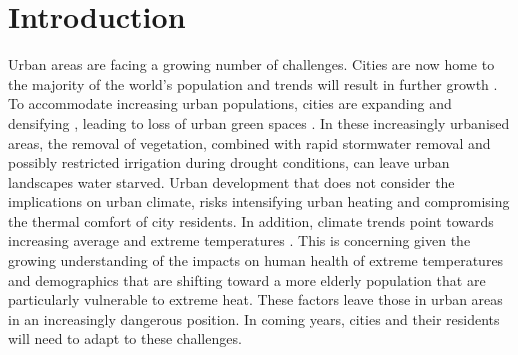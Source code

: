 \documentclass[final,3p,times,authoryear]{elsarticle}
\begin{document}

\section{Introduction}\label{sec:introduction}
Urban areas are facing a growing number of challenges. Cities are now home to the majority of the world's population and trends will result in further growth \citep{UNDESA2015,WHO2016}. To accommodate increasing urban populations, cities are expanding \citep{Seto2011} and densifying \citep{Byrne2016,Ruth2016,DSE2002}, leading to loss of urban green spaces \citep{Hamin2009,Coutts2007}. In these increasingly urbanised areas, the removal of vegetation, combined with rapid stormwater removal and possibly restricted irrigation during drought conditions, can leave urban landscapes water starved. Urban development that does not consider the implications on urban climate, risks intensifying urban heating and compromising the thermal comfort of city residents. In addition, climate trends point towards increasing average and extreme temperatures \citep{Alexander2009,IPCC2013a}. This is concerning given the growing understanding of the impacts on human health of extreme temperatures \citep{Katsouyanni1993,Nicholls2008,Loughnan2010} and demographics that are shifting toward a more elderly population \citep{Cohen2003,FIFARS2016} that are particularly vulnerable to extreme heat. These factors leave those in urban areas in an increasingly dangerous position. In coming years, cities and their residents will need to adapt to these challenges.
\end{document}
